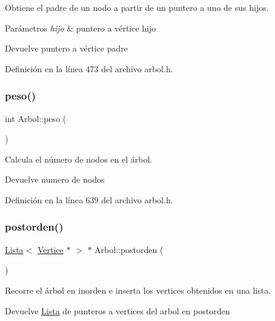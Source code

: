 Obtiene el padre de un nodo a partir de un puntero a uno de sus hijos. 


\begin{DoxyParams}{Parámetros}
{\em hijo} & puntero a vértice hijo \\
\hline
\end{DoxyParams}
\begin{DoxyReturn}{Devuelve}
puntero a vértice padre 
\end{DoxyReturn}


Definición en la línea 473 del archivo arbol.\+h.

\mbox{\label{classArbol_a9051a6b4120b42ff8d046f41ab73dbaa}} 
\subsubsection{\texorpdfstring{peso()}{peso()}}
{\footnotesize\ttfamily int Arbol\+::peso (\begin{DoxyParamCaption}{ }\end{DoxyParamCaption})}



Calcula el número de nodos en el árbol. 

\begin{DoxyReturn}{Devuelve}
numero de nodos 
\end{DoxyReturn}


Definición en la línea 639 del archivo arbol.\+h.

\mbox{\label{classArbol_a126e7d801dbe214ac39f183c26e9135d}} 
\subsubsection{\texorpdfstring{postorden()}{postorden()}}
{\footnotesize\ttfamily \hyperlink{classLista}{Lista}$<$ \hyperlink{classVertice}{Vertice} $\ast$ $>$ $\ast$ Arbol\+::postorden (\begin{DoxyParamCaption}{ }\end{DoxyParamCaption})}



Recorre el árbol en inorden e inserta los vertices obtenidos en una lista. 

\begin{DoxyReturn}{Devuelve}
\hyperlink{classLista}{Lista} de punteros a vertices del arbol en postorden 
\end{DoxyReturn}



